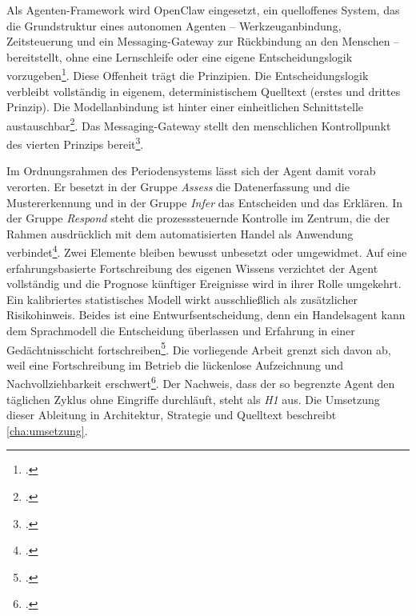 Als Agenten-Framework wird OpenClaw eingesetzt, ein quelloffenes System, das die
Grundstruktur eines autonomen Agenten -- Werkzeuganbindung, Zeitsteuerung und ein
Messaging-Gateway zur Rückbindung an den Menschen -- bereitstellt, ohne eine
Lernschleife oder eine eigene Entscheidungslogik
vorzugeben\footcites[vgl.][]{openclawRepo2026}[vgl.][]{openclawDocs2026}. Diese Offenheit trägt die Prinzipien. Die Entscheidungslogik verbleibt vollständig in eigenem, deterministischem Quelltext (erstes und drittes Prinzip). Die Modellanbindung ist hinter einer einheitlichen Schnittstelle austauschbar\footcite[vgl.][]{openclawProviders2026}. Das Messaging-Gateway stellt den menschlichen Kontrollpunkt des vierten Prinzips bereit\footcites[vgl.][]{openclawGateway2026}[vgl.][]{openclawSignal2026}.

Im Ordnungsrahmen des Periodensystems lässt sich der Agent damit vorab verorten. Er
besetzt in der Gruppe \textit{Assess} die Datenerfassung und die Mustererkennung und
in der Gruppe \textit{Infer} das Entscheiden und das Erklären. In der Gruppe
\textit{Respond} steht die prozesssteuernde Kontrolle im Zentrum, die der Rahmen
ausdrücklich mit dem automatisierten Handel als Anwendung verbindet\footcite[vgl.][S.~18]{bitkom2018}. Zwei Elemente bleiben bewusst unbesetzt
oder umgewidmet. Auf eine erfahrungsbasierte Fortschreibung des eigenen Wissens
verzichtet der Agent vollständig und die Prognose künftiger Ereignisse wird in ihrer
Rolle umgekehrt. Ein kalibriertes statistisches Modell wirkt ausschließlich als
zusätzlicher Risikohinweis. Beides ist eine Entwurfsentscheidung, denn ein Handelsagent kann dem Sprachmodell die Entscheidung
überlassen und Erfahrung in einer Gedächtnisschicht
fortschreiben\footcite[vgl.][S.~595--597]{yuFinmem2024}. Die vorliegende Arbeit
grenzt sich davon ab, weil eine Fortschreibung im Betrieb die lückenlose
Aufzeichnung und Nachvollziehbarkeit
erschwert\footcites[vgl.][Art.~12]{aiact2024}[vgl.][]{bafin2021}. Der Nachweis, dass
der so begrenzte Agent den täglichen Zyklus ohne Eingriffe durchläuft, steht als \emph{H1} aus. Die Umsetzung dieser Ableitung in Architektur, Strategie und Quelltext beschreibt \cref{cha:umsetzung}.

